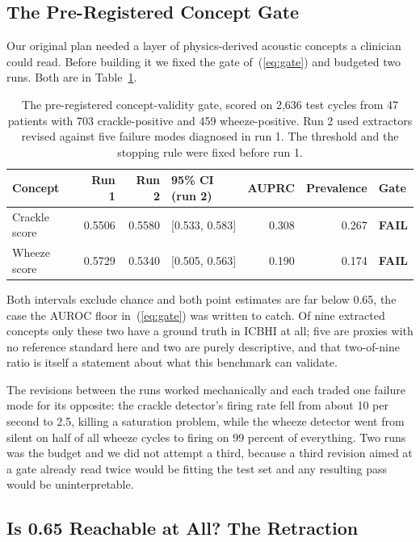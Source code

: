 \documentclass[journal,onecolumn]{IEEEtran}
\newcommand{\best}[1]{\textbf{#1}}
\begin{document}
\subsection{The Pre-Registered Concept Gate}
\label{subsec:gate}

Our original plan needed a layer of physics-derived acoustic concepts a clinician could read.
Before building it we fixed the gate of~(\ref{eq:gate}) and budgeted two runs. Both are in
Table~\ref{tab:gate}.

\begin{table}[!t]
\centering
\caption{The pre-registered concept-validity gate, scored on 2,636 test cycles from 47
patients with 703 crackle-positive and 459 wheeze-positive. Run 2 used extractors revised
against five failure modes diagnosed in run 1. The threshold and the stopping rule were fixed
before run 1.}
\label{tab:gate}
\footnotesize
\begin{tabular}{lrrlrrl}
\toprule
Concept & Run 1 & Run 2 & 95\% CI (run 2) & AUPRC & Prevalence & Gate \\
\midrule
Crackle score & 0.5506 & 0.5580 & [0.533, 0.583] & 0.308 & 0.267 & \best{FAIL} \\
Wheeze score  & 0.5729 & 0.5340 & [0.505, 0.563] & 0.190 & 0.174 & \best{FAIL} \\
\bottomrule
\end{tabular}

\vspace{2pt}
\footnotesize Both intervals exclude chance and both point estimates are far below 0.65, the
case the AUROC floor in~(\ref{eq:gate}) was written to catch. Of nine extracted concepts only
these two have a ground truth in ICBHI at all; five are proxies with no reference standard
here and two are purely descriptive, and that two-of-nine ratio is itself a statement about
what this benchmark can validate.
\end{table}

The revisions between the runs worked mechanically and each traded one failure mode for its
opposite: the crackle detector's firing rate fell from about 10 per second to 2.5, killing a
saturation problem, while the wheeze detector went from silent on half of all wheeze cycles to
firing on 99 percent of everything. Two runs was the budget and we did not attempt a third,
because a third revision aimed at a gate already read twice would be fitting the test set and
any resulting pass would be uninterpretable.

\subsection{Is 0.65 Reachable at All? The Retraction}
\label{subsec:ceiling}
\end{document}
